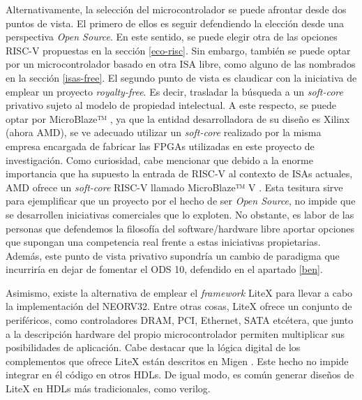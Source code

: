 Alternativamente, la selección del microcontrolador se puede afrontar desde dos puntos de vista.
El primero de ellos es seguir defendiendo la elección desde una perspectiva \textit{Open Source}.
En este sentido, se puede elegir otra de las opciones RISC-V propuestas en la sección \ref{eco-risc}.
Sin embargo, también se puede optar por un microcontrolador basado en otra ISA libre, como alguno de las nombrados en la sección \ref{isas-free}.
El segundo punto de vista es claudicar con la iniciativa de emplear un proyecto \textit{royalty-free}.
Es decir, trasladar la búsqueda a un \textit{soft-core} privativo sujeto al modelo de propiedad intelectual.
A este respecto, se puede optar por MicroBlaze™ \cite{microblaze}, ya que la entidad desarrolladora de su diseño es Xilinx (ahora AMD), se ve adecuado utilizar un \textit{soft-core} realizado por la misma empresa encargada de fabricar las FPGAs utilizadas en este proyecto de investigación.
Como curiosidad, cabe mencionar que debido a la enorme importancia que ha supuesto la entrada de RISC-V al contexto de ISAs actuales, AMD ofrece un \textit{soft-core} RISC-V llamado MicroBlaze™ V \cite{microblazeV}.
Esta tesitura sirve para ejemplificar que un proyecto por el hecho de ser \textit{Open Source}, no impide que se desarrollen iniciativas comerciales que lo exploten.
No obstante, es labor de las personas que defendemos la filosofía del software/hardware libre aportar opciones que supongan una competencia real frente a estas iniciativas propietarias.
Además, este punto de vista privativo supondría un cambio de paradigma que incurriría en dejar de fomentar el ODS 10, defendido en el apartado \ref{ben}.

Asimismo, existe la alternativa de emplear el \textit{framework} LiteX \cite{gh:litex} para llevar a cabo la implementación del NEORV32.
Entre otras cosas, LiteX ofrece un conjunto de periféricos, como controladores DRAM, PCI, Ethernet, SATA etcétera, que junto a la descripción hardware del propio microcontrolador permiten multiplicar sus posibilidades de aplicación.
Cabe destacar que la lógica digital de los complementos que ofrece LiteX están descritos en Migen \cite{gh:migen}.
Este hecho no impide integrar en él código en otros HDLs.
De igual modo, es común generar diseños de LiteX en HDLs más tradicionales, como verilog.

